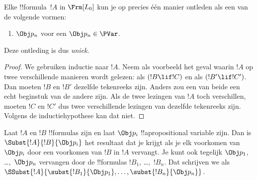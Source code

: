 \documentclass[../../../include/open-logic-section]{subfiles}
\begin{document}
\begin{prop}
Elke !!{formula}~$!A$ in $ \Frm[L_0]$ kun je op precies één manier
ontleden als een van de volgende vormen:
\begin{enumerate}


\item $\Obj p_n$ voor een $\Obj p_n \in  \PVar$.
  




\end{enumerate}
Deze ontleding is dus \emph{uniek}.
\end{prop}

\begin{proof}
We gebruiken inductie naar $!A$. Neem als voorbeeld het geval waarin
$!A$ op twee verschillende manieren wordt gelezen: als $(!B \lif !C)$
en als $(!B' \lif !C')$. Dan moeten $!B$ en $!B'$ dezelfde tekenreeks
zijn. Anders zou een van beide een echt beginstuk van de andere zijn.
Als de twee lezingen van $!A$ toch verschillen, moeten $!C$ en $!C'$
dus twee verschillende lezingen van dezelfde tekenreeks zijn. Volgens
de inductiehypothese kan dat niet.
\end{proof}


\begin{defn}
Laat $!A$ en $!B$ !!{formula}s zijn en laat $\Obj p_i$
!!a{propositional variable} zijn. Dan is
  $\Subst{!A}{!B}{\Obj p_i}$ het resultaat dat je krijgt als je elk
  voorkomen van $\Obj p_i$ door een voorkomen van $!B$ in $!A$ vervangt.
Je kunt ook tegelijk $\Obj p_1$, \dots,~$\Obj p_n$ vervangen door de
!!{formula}s $!B_1$, \dots,~$!B_n$. Dat schrijven we als
$\SSubst{!A}{\subst{!B_1}{\Obj p_1},\dots,\subst{!B_n}{\Obj p_n}}$.
\end{defn}
\end{document}
